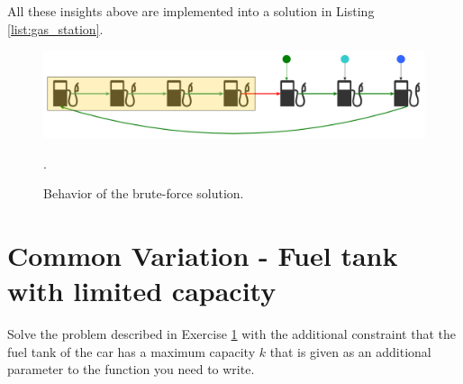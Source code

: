 All these insights above are implemented into a solution in Listing \ref{list:gas_station}.

\begin{figure}
	\centering
	\includegraphics[width=\textwidth]{sources/gas_station/images/example_expl2}
	\caption[]{Behavior of the brute-force solution.}.
	\label{fig:gas_station:fig:gas_station:example_expl2}
\end{figure}






\section{Common Variation - Fuel tank with limited capacity}

\begin{exercise}
	\label{example:gas_station:exercice1}
	Solve the problem described in Exercise \ref{} with the additional constraint that the fuel tank of the car has a maximum capacity $k$ that is given as an additional parameter to the function you need to write. 
\end{exercise}